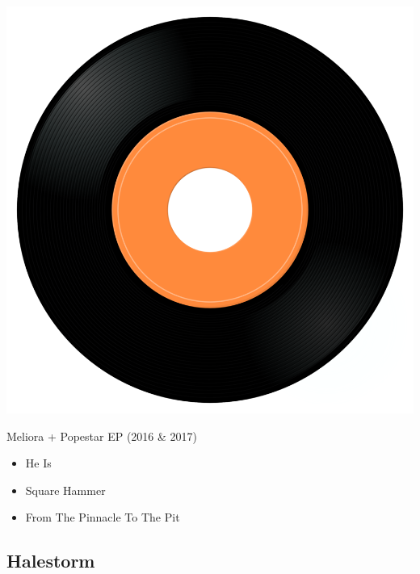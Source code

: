 \begin{minipage}[t]{0.25\textwidth}\vspace{0pt}
\captionsetup{type=figure}
\includegraphics[width=\textwidth]{Images/cover.png}
\caption*{Meliora + Popestar EP (2016 \& 2017)}
\end{minipage}
\begin{minipage}[t]{0.25\textwidth}\vspace{0pt}
\begin{itemize}[nosep,leftmargin=1em,labelwidth=*,align=left]
	\setlength{\itemsep}{0pt}
	\item He Is
	\item Square Hammer
	\item From The Pinnacle To The Pit
\end{itemize}
\end{minipage}

\subsection{Halestorm}

